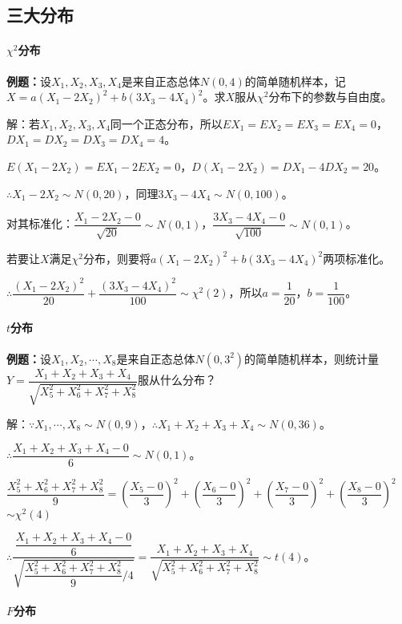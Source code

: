 \subsection{三大分布}

\paragraph{\texorpdfstring{$\chi^2$分布}{}}

\textbf{例题：}设$X_1,X_2,X_3,X_4$是来自正态总体$N(0,4)$的简单随机样本，记$X=a(X_1-2X_2)^2+b(3X_3-4X_4)^2$。求$X$服从$\chi^2$分布下的参数与自由度。

解：若$X_1,X_2,X_3,X_4$同一个正态分布，所以$EX_1=EX_2=EX_3=EX_4=0$，$DX_1=DX_2=DX_3=DX_4=4$。

$E(X_1-2X_2)=EX_1-2EX_2=0$，$D(X_1-2X_2)=DX_1-4DX_2=20$。

$\therefore X_1-2X_2\sim N(0,20)$，同理$3X_3-4X_4\sim N(0,100)$。

对其标准化：$\dfrac{X_1-2X_2-0}{\sqrt{20}}\sim N(0,1)$，$\dfrac{3X_3-4X_4-0}{\sqrt{100}}\sim N(0,1)$。

若要让$X$满足$\chi^2$分布，则要将$a(X_1-2X_2)^2+b(3X_3-4X_4)^2$两项标准化。

$\therefore\dfrac{(X_1-2X_2)^2}{20}+\dfrac{(3X_3-4X_4)^2}{100}\sim\chi^2(2)$，所以$a=\dfrac{1}{20}$，$b=\dfrac{1}{100}$。

\paragraph{\texorpdfstring{$t$分布}{}}

\textbf{例题：}设$X_1,X_2,\cdots,X_8$是来自正态总体$N(0,3^2)$的简单随机样本，则统计量$Y=\dfrac{X_1+X_2+X_3+X_4}{\sqrt{X_5^2+X_6^2+X_7^2+X_8^2}}$服从什么分布？

解：$\because X_1,\cdots,X_8\sim N(0,9)$，$\therefore X_1+X_2+X_3+X_4\sim N(0,36)$。

$\therefore\dfrac{X_1+X_2+X_3+X_4-0}{6}\sim N(0,1)$。

$\dfrac{X_5^2+X_6^2+X_7^2+X_8^2}{9}=\left(\dfrac{X_5-0}{3}\right)^2+\left(\dfrac{X_6-0}{3}\right)^2+\left(\dfrac{X_7-0}{3}\right)^2+\left(\dfrac{X_8-0}{3}\right)^2$\\$\sim\chi^2(4)$

$\therefore\dfrac{\dfrac{X_1+X_2+X_3+X_4-0}{6}}{\sqrt{\dfrac{X_5^2+X_6^2+X_7^2+X_8^2}{9}/4}}=\dfrac{X_1+X_2+X_3+X_4}{\sqrt{X_5^2+X_6^2+X_7^2+X_8^2}}\sim t(4)$。

\paragraph{\texorpdfstring{$F$分布}{}}

